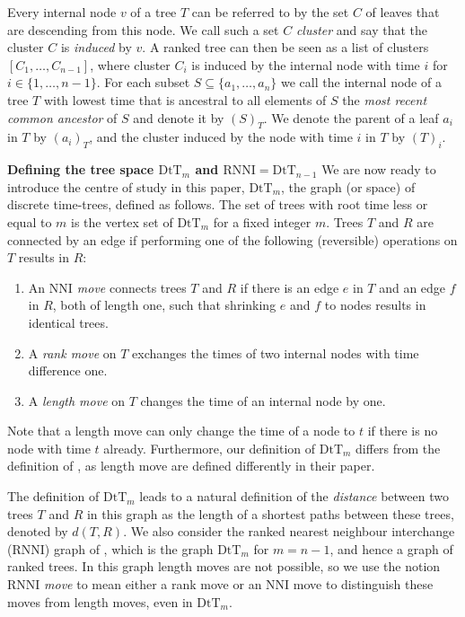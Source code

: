 \documentclass[11pt]{amsart}
\newcommand{\rnni}{\mathrm{RNNI}}
\newcommand{\nni}{\mathrm{NNI}}
\newcommand{\dtt}{\mathrm{DtT}}
\newcommand{\summary}[1]{\textbf{#1}} %
\begin{document}
Every internal node $v$ of a tree $T$ can be referred to by the set $C$ of leaves that are descending from this node.
We call such a set $C$ \emph{cluster} and say that the cluster $C$ is \emph{induced} by $v$.
A ranked tree can then be seen as a list of clusters $[C_1, \ldots, C_{n-1}]$, where cluster $C_i$ is induced by the internal node with time $i$ for $i \in \{1, \ldots, n-1\}$.
For each subset $S \subseteq \{a_1, \ldots, a_n\}$ we call the internal node of a tree $T$ with lowest time that is ancestral to all elements of $S$ the \emph{most recent common ancestor} of $S$ and denote it by $(S)_T$.
We denote the parent of a leaf $a_i$ in $T$ by $(a_i)_T$, and the cluster induced by the node with time $i$ in $T$ by $(T)_i$.

\summary{Defining the tree space $\dtt_m$ and $\rnni = \dtt_{n-1}$}
We are now ready to introduce the centre of study in this paper, $\dtt_m$, the graph (or space) of discrete time-trees, defined as follows.
The set of trees with root time less or equal to $m$ is the vertex set of $\dtt_m$ for a fixed integer $m$.
Trees $T$ and $R$ are connected by an edge if performing one of the following (reversible) operations on $T$ results in $R$:
\begin{enumerate}
	\item An \emph{$\nni$ move} connects trees $T$ and $R$ if there is an edge $e$ in $T$ and an edge $f$ in $R$, both of length one, such that shrinking $e$ and $f$ to nodes results in identical trees.
	\item A \emph{rank move} on $T$ exchanges the times of two internal nodes with time difference one.
	\item A \emph{length move} on $T$ changes the time of an internal node by one.
\end{enumerate}
Note that a length move can only change the time of a node to $t$ if there is no node with time $t$ already.
Furthermore, our definition of $\dtt_m$ differs from the definition of \textcite{Gavryushkin2018-ol}, as length move are defined differently in their paper.

The definition of $\dtt_m$ leads to a natural definition of the \emph{distance} between two trees $T$ and $R$ in this graph as the length of a shortest paths between these trees, denoted by $d(T,R)$.
We also consider the ranked nearest neighbour interchange ($\rnni$) graph of \textcite{Collienne2020-iu}, which is the graph $\dtt_m$ for $m=n-1$, and hence a graph of ranked trees.
In this graph length moves are not possible, so we use the notion $\rnni$ \emph{move} to mean either a rank move or an $\nni$ move to distinguish these moves from length moves, even in $\dtt_m$.
\end{document}
